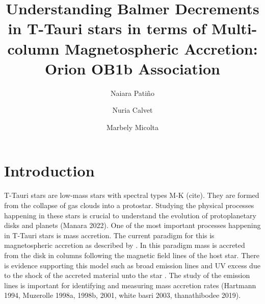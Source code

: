 \documentclass[twocolumn,linenumbers]{aastex631}
\begin{document}
\title{Understanding Balmer Decrements in T-Tauri stars in terms of Multi-column Magnetospheric Accretion: Orion OB1b Association}


\author[0009-0009-7455-6777]{Naiara Patiño}

\author[0000-0002-3950-5386]{Nuria Calvet}

\author[0000-0001-8022-4378]{Marbely Micolta}




\begin{abstract}

    
\end{abstract}


\section{Introduction}

T-Tauri stars are low-mass stars with spectral types M-K (cite). They are formed from the collapse of gas clouds into a protostar. Studying the physical processes happening in these stars is crucial to understand the evolution of protoplanetary disks and planets (Manara 2022). One of the most important processes happening in T-Tauri stars is mass accretion. The current paradigm for this is magnetospheric accretion as described by \citep{hartmann2016}. In this paradigm mass is accreted from the disk in columns following the magnetic field lines of the host star. There is evidence supporting this model such as broad emission lines \citep{muzerolle2001} and UV excess due to the shock of the accreted material unto the star \citep{calvet_gullbring1998}. The study of the emission lines is important for identifying and measuring mass accretion rates (Hartmann 1994, Muzerolle 1998a, 1998b, 2001, white basri 2003, thanathibodee 2019).
\end{document}
